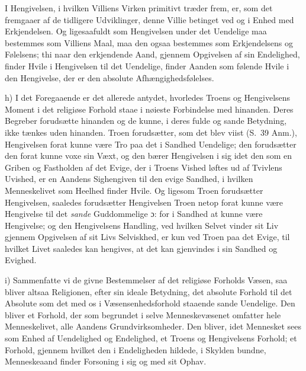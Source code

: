I Hengivelsen, i hvilken Villiens Virken primitivt træder frem, er, som det
fremgaaer af de tidligere Udviklinger, denne Villie betinget ved og i Enhed
med Erkjendelsen. Og ligesaafuldt som Hengivelsen under det Uendelige maa
bestemmes som Villiens Maal, maa den ogsaa bestemmes som Erkjendelsens og
Følelsens; thi naar den erkjendende Aand, gjennem Opgivelsen af sin
Endelighed, finder Hvile i Hengivelsen til det Uendelige, finder Aanden som
følende Hvile i den Hengivelse, der er den absolute Afhængighedsfølelses.

h) I det Foregaaende er det allerede antydet, hvorledes
 Troens og Hengivelsens Moment i det religiøse Forhold staae i nøieste
Forbindelse med hinanden. Deres Begreber forudsætte hinanden og de kunne, i
deres fulde og sande Betydning, ikke tænkes uden hinanden. Troen forudsætter,
som det blev viist (S.\ 39 Anm.), Hengivelsen forat kunne være Tro paa det i
Sandhed Uendelige; den forudsætter den forat kunne voxe sin Væxt, og den bærer
Hengivelsen i sig idet den som en Griben og Fastholden af det Evige, der i
Troens Vished løftes ud af Tvivlens Uvished, er en Aandens Sighengiven til den
evige Sandhed, i hvilken Menneskelivet som Heelhed finder Hvile. Og ligesom
Troen forudsætter Hengivelsen, saaledes forudsætter Hengivelsen Troen netop
forat kunne være Hengivelse til det \emph{sande} Guddommelige ɔ: for i Sandhed
at kunne være Hengivelse; og den Hengivelsens Handling, ved hvilken Selvet
vinder sit Liv gjennem Opgivelsen af sit Livs Selviskhed, er kun ved Troen paa
det Evige, til hvilket Livet saaledes kan hengives, at det kan gjenvindes i sin
Sandhed og Evighed.

i) Sammenfatte vi de givne Bestemmelser af det religiøse Forholds Væsen, saa
bliver altsaa Religionen, efter sin ideale Betydning, det absolute Forhold til
det Absolute som det med os i Væsensenhedsforhold staaende sande Uendelige. Den
bliver et Forhold, der som begrundet i selve Menneskevæsenet omfatter hele
Menneskelivet, alle Aandens Grundvirksomheder. Den bliver, idet Mennesket sees
som Enhed af Uendelighed og Endelighed, et Troens og Hengivelsens Forhold; et
Forhold, gjennem hvilket den i Endeligheden hildede, i Skylden bundne,
Menneskeaand finder Forsoning i sig og med sit Ophav.

